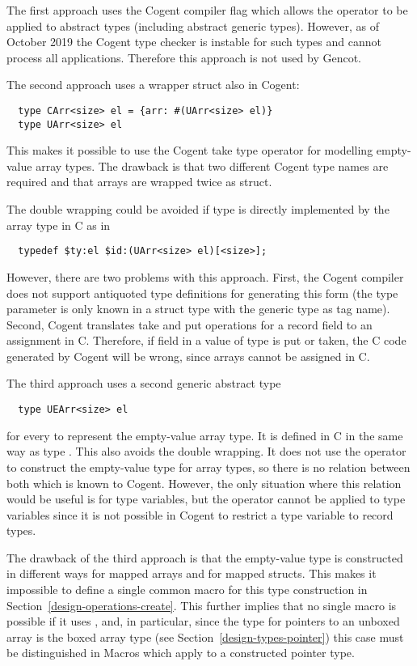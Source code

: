 The first approach uses the Cogent compiler flag  which allows the  operator to
be applied to abstract types (including abstract generic types). However, as of October 2019 the Cogent type checker 
is instable for such types and cannot process all applications. Therefore this approach is not used by Gencot.

The second approach uses a wrapper struct also in Cogent:
\begin{verbatim}
  type CArr<size> el = {arr: #(UArr<size> el)}
  type UArr<size> el
\end{verbatim}
This makes it possible to use the Cogent take type operator for modelling empty-value array types.
The drawback is that two different Cogent type names are required and that arrays are wrapped twice as struct.

The double wrapping could be avoided if type  is directly implemented by the array type
in C as in
\begin{verbatim}
  typedef $ty:el $id:(UArr<size> el)[<size>];
\end{verbatim}
However, there are two problems with this approach. First, the Cogent compiler does not support antiquoted
type definitions for generating this form (the type parameter  is only known in a struct type
with the generic type as tag name). Second, Cogent translates take and put operations for a record field 
to an assignment in C. Therefore, if field  in a value of type  is put or taken, 
the C code generated by Cogent will be wrong, since arrays cannot be assigned in C. 

The third approach uses a second generic abstract type 
\begin{verbatim}
  type UEArr<size> el
\end{verbatim}
for every  to represent the empty-value array type. It is defined in C in the same way as type .
This also avoids the double wrapping. It does not use the  operator to construct the empty-value type
for array types, so there is no relation between both which is known to Cogent. However, the only situation where this
relation would be useful is for type variables, but the  operator cannot be applied to type variables since
it is not possible in Cogent to restrict a type variable to record types. 

The drawback of the third approach is that the empty-value 
type is constructed in different ways for mapped arrays and for mapped structs. This makes it impossible to define 
a single common macro  for this type construction in Section~\ref{design-operations-create}. This further 
implies that no single macro is possible if it uses , and, in particular, since the type for pointers to
an unboxed array is the boxed array type (see Section~\ref{design-types-pointer}) this case must be distinguished 
in Macros which apply  to a constructed pointer type.

